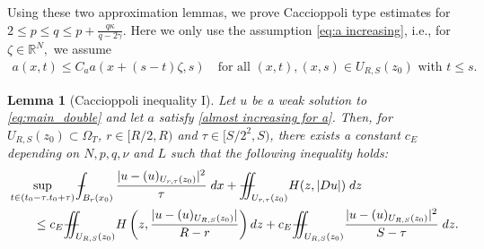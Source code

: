 \documentclass[notitlepage,11pt,reqno]{amsart}
\newtheorem{lemma}[theorem]{Lemma}
\theoremstyle{definition}
\numberwithin{equation}{section}
\newcommand{\RR}{\mathds{R}}
\newcommand{\iintss}{{\int\hspace{-0.28cm}\int}}
\newcommand{ \miints }{{\iintss\hspace{-0.56cm} -\hspace{-0.15cm}-}}
\newcommand{\miint}[1]{{\miints_{\hspace{-0.13cm}#1}}}
\def\Xint#1{\mathchoice
	{\XXint\displaystyle\textstyle{#1}}%
	{\XXint\textstyle\scriptstyle{#1}}%
	{\XXint\scriptstyle\scriptscriptstyle{#1}}%
	{\XXint\scriptscriptstyle\scriptscriptstyle{#1}}%
	\!\int}
\def\XXint#1#2#3{{\setbox0=\hbox{$#1{#2#3}{\int}$}
		\vcenter{\hbox{$#2#3$}}\kern-.50\wd0}}
\def\Xint#1{\mathchoice
	{\XXint\displaystyle\textstyle{#1}}%
	{\XXint\textstyle\scriptstyle{#1}}%
	{\XXint\scriptstyle\scriptscriptstyle{#1}}%
	{\XXint\scriptscriptstyle\scriptscriptstyle{#1}}%
	\!\int}
\def\XXint#1#2#3{{\setbox0=\hbox{$#1{#2#3}{\int}$}
		\vcenter{\hbox{$#2#3$}}\kern-.50\wd0}}
\def\dashint{\Xint-}
\begin{document}
Using these two approximation lemmas, we prove Caccioppoli type estimates for $2\le p\le q\le p +\frac{q\kappa}{q-2\gamma}.$ Here we only use the assumption \eqref{eq:a increasing}, i.e., for $\zeta \in \RR^N,$ we assume
\begin{align}\label{almost increasing for a}
 a(x,t) \leq C_a a(x+(s-t)\zeta,s) \quad \text{for all } (x,t),(x,s)\in U_{R, S}(z_0) \text{ with } t \leq s. 
\end{align}
\begin{lemma}[Caccioppoli inequality I] \label{lem: energy inequality}
  Let $u$ be a weak solution to \eqref{eq:main_double} and let $a$ satisfy \eqref{almost increasing for a}. Then, for $U_{R,S}(z_0)\subset \Omega_T$, $r\in [R/2,R)$ and $\tau\in[S/2^2,S)$, there exists a constant $c_E$ depending on $N,p,q,\nu$ and $L$ such that the following inequality holds: 
    \begin{align*}
        &\sup_{t\in(t_0-\tau.t_0+\tau)}\dashint_{B_r(x_0)} \frac{|u-(u)_{U_{r,\tau}(z_0)}|^2}{\tau}\; dx +\miint{U_{r,\tau}(z_0)}H(z,|Du|)\;dz\\
        &\qquad \leq c_E\miint{U_{R,S}(z_0)}   H\left(z,\frac{|u-(u)_{U_{R,S}(z_0)}|}{R-r}\right) dz + c_E\miint{U_{R,S}(z_0)}\frac{|u-(u)_{U_{R,S}(z_0)}|^2}{S-\tau}\;dz.
    \end{align*}   
\end{lemma}
\end{document}
